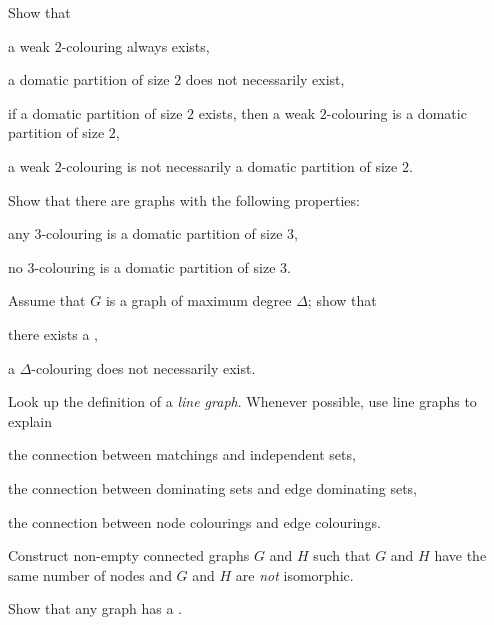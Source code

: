 \begin{ex}
    Show that
    \begin{subex}
        \item a weak $2$-colouring always exists,
        \item a domatic partition of size $2$ does not necessarily exist,
        \item if a domatic partition of size $2$ exists, then a weak $2$-colouring is a domatic partition of size $2$,
        \item a weak $2$-colouring is not necessarily a domatic partition of size $2$.
    \end{subex}
    Show that there are  graphs with the following properties:
    \begin{subex}[resume]
        \item any $3$-colouring is a domatic partition of size $3$,
        \item no $3$-colouring is a domatic partition of size $3$.
    \end{subex}
    Assume that $G$ is a graph of maximum degree $\Delta$; show that
    \begin{subex}[resume]
        \item there exists a \Dpocol,
        \item a $\Delta$-colouring does not necessarily exist.
    \end{subex}
\end{ex}

\begin{ex}
    Look up the definition of a \emph{line graph}. Whenever possible, use line graphs to explain
    \begin{subex}
        \item the connection between matchings and independent sets,
        \item the connection between dominating sets and edge dominating sets,
        \item the connection between node colourings and edge colourings.
    \end{subex}
\end{ex}

\begin{ex}[isomorphism]
    Construct non-empty  connected graphs $G$ and $H$ such that $G$ and $H$ have the same number of nodes and $G$ and $H$ are \emph{not} isomorphic.
\end{ex}

\begin{ex}[Petersen 1891]\label{ex:2fact}
    Show that any  graph has a .
\end{ex}

